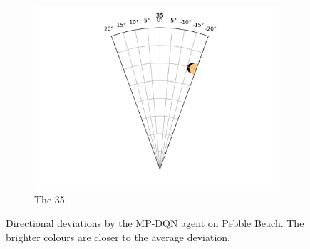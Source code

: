 \documentclass{kththesis}
\begin{document}
\begin{figure}
\begin{subfigure}{0.4\textwidth}
    \centering
    \includegraphics[width=\textwidth]{AgentDirectionChoices/MPDQN_Pebble_Direction_Choices_35.png} 
    \caption{The 35.}
    \label{fig:35_pebble_deviation}
    \end{subfigure}
    \caption{Directional deviations by the MP-DQN agent on Pebble Beach. The brighter colours are closer to the average deviation.}
\end{figure}
\end{document}
